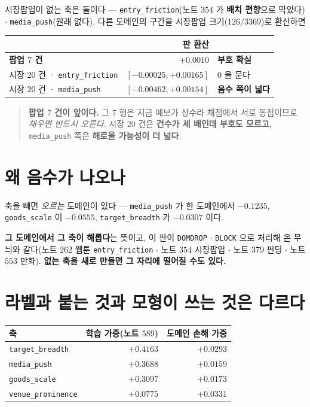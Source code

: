 \documentclass[11pt]{article}
\begin{document}
시장팝업이 없는 축은 둘이다 --- \texttt{entry\_friction}(노트 $354$ 가
\textbf{배치 편향}으로 막았다) $\cdot$ \texttt{media\_push}(원래 없다).
다른 도메인의 구간을 시장팝업 크기($126/3369$)로 환산하면

\begin{center}
\begin{tabular}{lrl}
\hline
 & 판 환산 & \\
\hline
\textbf{팝업 $7$ 건} & $\mathbf{+0.0010}$ & \textbf{부호 확실} \\
시장 $20$ 건 · \texttt{entry\_friction} & $[-0.00025, +0.00165]$ & $0$ 을 문다 \\
시장 $20$ 건 · \texttt{media\_push} & $[\mathbf{-0.00462}, +0.00154]$ & \textbf{음수 쪽이 넓다} \\
\hline
\end{tabular}
\end{center}

\begin{quote}
\textbf{팝업 $7$ 건이 앞이다.} 그 $7$ 행은 지금 예보가 상수라 채점에서
서로 동점이므로 \emph{채우면 반드시 오른다}. 시장 $20$ 건은 \textbf{건수가
세 배인데 부호도 모르고}, \texttt{media\_push} 쪽은 \textbf{해로울 가능성이
더 넓다}.
\end{quote}

\section{왜 음수가 나오나}

축을 빼면 \emph{오르는} 도메인이 있다 --- \texttt{media\_push} 가 한
도메인에서 $\mathbf{-0.1235}$, \texttt{goods\_scale} 이 $-0.0555$,
\texttt{target\_breadth} 가 $-0.0307$ 이다.

\textbf{그 도메인에서 그 축이 해롭다}는 뜻이고, 이 판이 \texttt{DOMDROP}
$\cdot$ \texttt{BLOCK} 으로 처리해 온 무늬와 같다(노트 $262$ 웹툰
\texttt{entry\_friction} $\cdot$ 노트 $354$ 시장팝업 $\cdot$ 노트 $379$
펀딩 $\cdot$ 노트 $553$ 만화). \textbf{없는 축을 새로 만들면 그 자리에
떨어질 수도 있다.}

\section{라벨과 붙는 것과 모형이 쓰는 것은 다르다}

\begin{center}
\begin{tabular}{lrr}
\hline
축 & 학습 가중(노트 $589$) & 도메인 손해 가중 \\
\hline
\texttt{target\_breadth} & $+0.4163$ & $+0.0293$ \\
\texttt{media\_push} & $+0.3688$ & $+0.0159$ \\
\texttt{goods\_scale} & $+0.3097$ & $+0.0173$ \\
\texttt{venue\_prominence} & $\mathbf{+0.0775}$ & $\mathbf{+0.0331}$ \\
\hline
\end{tabular}
\end{center}
\end{document}
